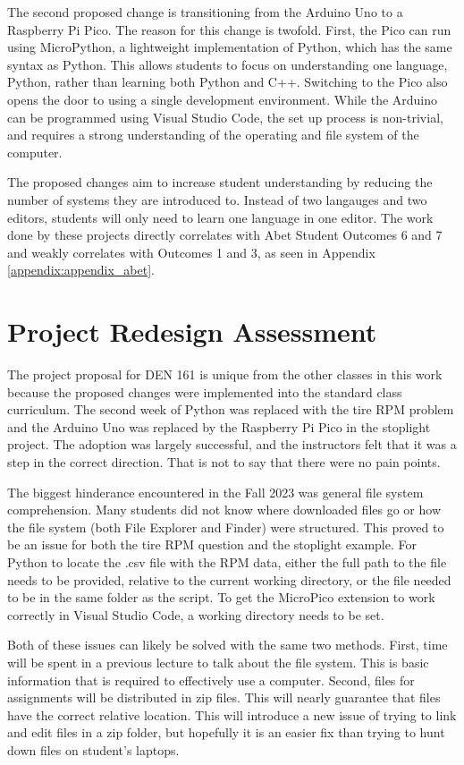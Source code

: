The second proposed change is transitioning from the Arduino Uno to a Raspberry Pi Pico. The reason for this 
change is twofold. First, the Pico can run using MicroPython, a lightweight implementation of Python, which has 
the same syntax as Python. This allows students to focus on understanding one language, Python, rather than 
learning both Python and C++. Switching to the Pico also opens the door to using a single development environment. 
While the Arduino can be programmed using Visual Studio Code, the set up process is non-trivial, and requires a 
strong understanding of the operating and file system of the computer. 

The proposed changes aim to increase student understanding by reducing the number of systems they are introduced 
to. Instead of two langauges and two editors, students will only need to learn one language in one editor. The 
work done by these projects directly correlates with Abet Student Outcomes 6 and 7 and weakly correlates with 
Outcomes 1 and 3, as seen in Appendix \ref{appendix:appendix_abet}.

\section{Project Redesign Assessment}

The project proposal for DEN 161 is unique from the other classes in this work because the proposed changes were
implemented into the standard class curriculum. The second week of Python was replaced with the tire RPM problem
and the Arduino Uno was replaced by the Raspberry Pi Pico in the stoplight project. The adoption was largely 
successful, and the instructors felt that it was a step in the correct direction. That is not to say that there
were no pain points.

The biggest hinderance encountered in the Fall 2023 was general file system comprehension. Many students did not 
know where downloaded files go or how the file system (both File Explorer and Finder) were structured. This proved 
to be an issue for both the tire RPM question and the stoplight example. For Python to locate the .csv file 
with the RPM data, either the full path to the file needs to be provided, relative to the current working directory,
or the file needed to be in the same folder as the script. To get the MicroPico extension to work correctly in
Visual Studio Code, a working directory needs to be set. 

Both of these issues can likely be solved with the same two methods. First, time will be spent in a previous lecture
to talk about the file system. This is basic information that is required to effectively use a computer. Second,
files for assignments will be distributed in zip files. This will nearly guarantee that files have the correct
relative location. This will introduce a new issue of trying to link and edit files in a zip folder, but hopefully
it is an easier fix than trying to hunt down files on student's laptops.

